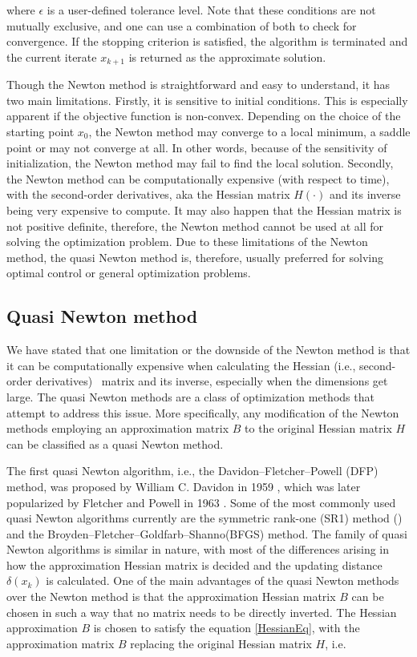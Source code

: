\documentclass  [
  paper    = a4,
  BCOR     = 10mm,
  twoside,
  fontsize = 12pt,
  fleqn,
  toc      = bibnumbered,
  toc      = listofnumbered,
  numbers  = noendperiod,
  headings = normal,
  listof   = leveldown,
  version  = 3.03
]                                       {scrreprt}
\newcommand{\<}{\langle}
\renewcommand{\>}{\rangle}
\begin{document}
where $\epsilon$ is a user-defined tolerance level. Note that these conditions are not mutually exclusive, and one can use a combination of both to check for convergence. If the stopping criterion is satisfied, the algorithm is terminated and the current iterate $x_{k+1}$ is returned as the approximate solution.

Though the Newton method is straightforward and easy to understand, it has two main limitations. Firstly, it is sensitive to initial conditions. This is especially apparent if the objective function is non-convex. Depending on the choice of the starting point $x_0$, the Newton method may converge to a local minimum, a saddle point or may not converge at all. In other words, because of the sensitivity of initialization, the Newton method may fail to find the local solution. Secondly, the Newton method can be computationally expensive (with respect to time), with the second-order derivatives, aka the Hessian matrix $H(\cdot)$ and its inverse being very expensive to compute. It may also happen that the Hessian matrix is not positive definite, therefore, the Newton method cannot be used at all for solving the optimization problem. Due to these limitations of the Newton method, the quasi Newton method is, therefore, usually preferred for solving optimal control or general optimization problems.


\subsection{Quasi Newton method}
We have stated that one limitation or the downside of the Newton method is that it can be computationally expensive when calculating the Hessian (i.e., second-order derivatives)  matrix and its inverse, especially when the dimensions get large. The quasi Newton methods are a class of optimization methods that attempt to address this issue. More specifically, any modification of the Newton methods employing an approximation matrix $B$ to the original Hessian matrix $H$ can be classified as a quasi Newton method. 

The first quasi Newton algorithm, i.e., the Davidon–Fletcher–Powell (DFP) method, was proposed by William C. Davidon in 1959 \cite{WilDav59}, which was later popularized by Fletcher and Powell in 1963 \cite{FlePow63}. Some of the most commonly used quasi Newton algorithms currently are the symmetric rank-one (SR1) method (\cite{ANP91}) and the Broyden–Fletcher–Goldfarb–Shanno(BFGS) method. The family of quasi Newton algorithms is similar in nature, with most of the differences arising in how the approximation Hessian matrix is decided and the updating distance $\delta(x_k) $ is calculated. One of the main advantages of the quasi Newton methods over the Newton method is that the approximation Hessian matrix $B$ can be chosen in such a way that no matrix needs to be directly inverted. The Hessian approximation $B$ is chosen to satisfy the equation \ref{HessianEq}, with the approximation matrix $B$ replacing the original Hessian matrix $H$, i.e.
\end{document}
